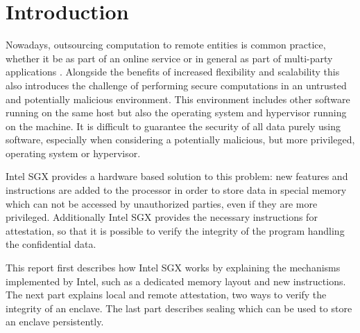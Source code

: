 \section{Introduction} \label{sec:introduction}
Nowadays, outsourcing computation to remote entities is common practice, whether it be as part of an online service or 
in general as part of multi-party applications \cite{UseOfIntelSGX}. 
Alongside the benefits of increased flexibility and scalability this also introduces the challenge of performing secure 
computations in an untrusted and potentially malicious environment. 
This environment includes other software running on the same host but also the operating system and hypervisor running
on the machine.
It is difficult to guarantee the security of all data purely using software, especially when considering a potentially 
malicious, but more privileged, operating system or hypervisor.

Intel SGX provides a hardware based solution to this problem: new features and instructions are added to the processor
in order to store data in special memory which can not be accessed by unauthorized parties, even if they are more
privileged. Additionally Intel SGX provides the necessary instructions for attestation, so that it is possible to
verify the integrity of the program handling the confidential data.

This report first describes how Intel SGX works by explaining the mechanisms implemented by Intel, such as a
dedicated memory layout and new instructions. The next part explains local and remote attestation, two ways to
verify the integrity of an enclave. The last part describes sealing which can be used to store an enclave persistently.
